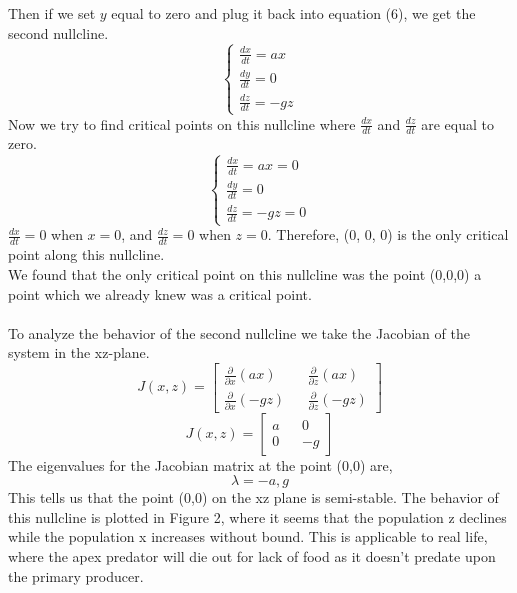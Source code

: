 \documentclass[11pt,oneside]{article}
\begin{document}
	Then if we set $y$ equal to zero and plug it back into equation (6), we get the second nullcline.
	\begin{equation}
	\begin{cases}
	\frac{dx}{dt} = ax\\
	\frac{dy}{dt} = 0\\
	\frac{dz}{dt} = -gz
	\end{cases}
	\end{equation}
	Now we try to find critical points on this nullcline where $\frac{dx}{dt}$ and $\frac{dz}{dt}$ are equal to zero.
	\begin{equation}
	\begin{cases}
	\frac{dx}{dt} = ax = 0\\
	\frac{dy}{dt} = 0\\
	\frac{dz}{dt} = -gz = 0
	\end{cases}
	\end{equation}
	$\frac{dx}{dt} = 0$ when $x = 0$, and $\frac{dz}{dt} = 0$ when $z = 0$. Therefore, ($0$, $0$, $0$) is the only critical point along this nullcline.\\
	We found that the only critical point on this nullcline was the point (0,0,0) a point which we already knew was a critical point.\\\\
	To analyze the behavior of the second nullcline we take the Jacobian of the system in the xz-plane.
	\begin{equation}
	J(x,z) = 
	\begin{bmatrix}
	\frac{\partial}{\partial x}(ax) && \frac{\partial}{\partial z}(ax) \\
	\frac{\partial}{\partial x}(-gz) && \frac{\partial}{\partial z}(-gz)
	\end{bmatrix}
	\end{equation}	
	\begin{equation}
	J(x,z) = 
	\begin{bmatrix}
	a && 0 \\
	0 && -g
	\end{bmatrix}
	\end{equation}
	The eigenvalues for the Jacobian matrix at the point (0,0) are,
	\[\lambda = -a, g\]
	This tells us that the point (0,0) on the xz plane is semi-stable. The behavior of this nullcline is plotted in Figure 2, where it seems that the population z declines while the population x increases without bound. This is applicable to real life, where the apex predator will die out for lack of food as it doesn't predate upon the primary producer.
	
\end{document}
